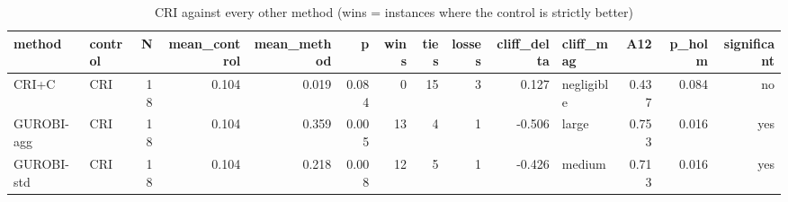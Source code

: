\begin{table}[htbp]
\centering
\small
\caption{CRI against every other method (wins = instances where the control is strictly better)}
\label{tab:E3_long_runs_b600_vs_CRI}
\begin{tabular}{llrrrrrrrrlrrr}
\toprule
method & control & N & mean\_control & mean\_method & p & wins & ties & losses & cliff\_delta & cliff\_mag & A12 & p\_holm & significant \\
\midrule
CRI+C & CRI & 18 & 0.104 & 0.019 & 0.084 & 0 & 15 & 3 & 0.127 & negligible & 0.437 & 0.084 & no \\
GUROBI-agg & CRI & 18 & 0.104 & 0.359 & 0.005 & 13 & 4 & 1 & -0.506 & large & 0.753 & 0.016 & yes \\
GUROBI-std & CRI & 18 & 0.104 & 0.218 & 0.008 & 12 & 5 & 1 & -0.426 & medium & 0.713 & 0.016 & yes \\
\bottomrule
\end{tabular}
\end{table}
